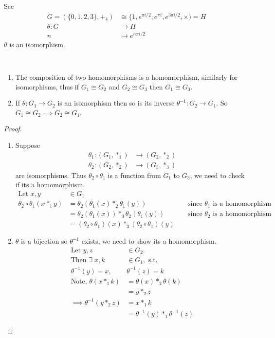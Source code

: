 See 
\begin{align*}
    G = (\{ 0, 1, 2, 3 \}, +_4) &\cong \{1, e^{\pi i/2}, e^{\pi i}, e^{3\pi i/2}, \times) = H \\
    \theta: G &\to H \\
    n &\mapsto e^{n \pi i /2}
\end{align*}
$\theta$ is an isomorphism.

\begin{lemma}~
  \vspace*{-1.5\baselineskip}
\begin{enumerate}
\def\labelenumi{\roman{enumi}.}
  \item The composition of two homomorphisms is a homomorphism, similarly for isomorphisms, thus if $G_1 \cong G_2$ and $G_2 \cong G_3$ then $G_1 \cong G_3$.
  \item
    If $\theta : G_1 \to G_2$ is an isomorphism then so is its inverse $\theta^{-1} : G_2 \to G_1$.
    So $G_1 \cong G_2 \implies G_2 \cong G_1$.
\end{enumerate}
\end{lemma}

\begin{proof} ~ 

\begin{enumerate}
\def\labelenumi{\roman{enumi}.}
  \item Suppose
  \begin{align*}
      \theta_1 : (G_1, *_1) &\to (G_2, *_2) \\
      \theta_2 : (G_2, *_2) &\to (G_3, *_3)
  \end{align*}
  are isomorphisms.
  Thus $\theta_2 \circ \theta_1$ is a function from $G_1$ to $G_3$, we need to check if its a homomorphism.
  \begin{align*}
      \text{Let } x, y &\in G_1 && \\
      \theta_2 \circ \theta_1 (x *_1 y) &= \theta_2(\theta_1(x) *_2 \theta_1(y)) & &\text{ since $\theta_1$ is a homomorphism} \\
      &= \theta_2(\theta_1(x)) *_3 \theta_2(\theta_1(y)) & &\text{ since $\theta_2$ is a homomorphism} \\
      &= (\theta_2 \circ \theta_1)(x) *_3 (\theta_2 \circ \theta_1)(y) &&
  \end{align*}
  \item
    $\theta$ is a bijection so $\theta^{-1}$ exists, we need to show its a homomorphism.
    \begin{align*}
    \text{Let } y, z &\in G_2. \\
    \text{Then } \exists \; x, k &\in G_1, \text{ s.t.} \\
    \theta^{-1}(y) = x,\ &\theta^{-1}(z) = k \\
    \text{Note, } \theta(x *_1 k) &= \theta(x) *_2 \theta(k) \\
    &= y *_2 z \\
    \implies \theta^{-1}(y *_2 z) &= x *_1 k \\
    &= \theta^{-1}(y) *_1 \theta^{-1}(z)
    \end{align*}
\end{enumerate}
\end{proof}

